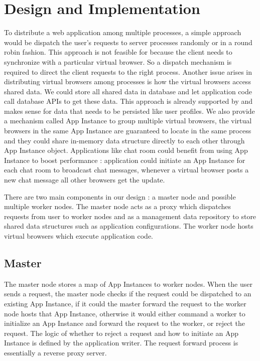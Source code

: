 \section{Design and Implementation}
\label{sec:implementation}

To distribute a web application among multiple processes, 
a simple approach would be dispatch the user's requests to server processes randomly or in a round robin fashion.
This approach is not feasible for \cb{} because 
the client needs to synchronize with a particular virtual browser.
So a dispatch mechanism is required to direct the client requests to the right process.
Another issue arises in distributing virtual browsers among processes is 
how the virtual browsers access shared data.
We could store all shared data in database and let application code call database APIs to get these data.
This approach is already supported by \cb{} and makes sense for data that needs to be persisted like user profiles. 
We also provide a mechanism called App Instance to group multiple virtual browsers,
the virtual browsers in the same App Instance are guaranteed to locate in the same process and they could
share in-memory data structure directly to each other through App Instance object.
Applications like chat room could benefit from using App Instance to boost performance :
application could initiate an App Instance for each chat room to broadcast chat messages, 
whenever a virtual browser posts a new chat message all other browsers get the update.





There are two main components in our design : a master node and possible multiple worker nodes.
The master node acts as a proxy which dispatches requests from user to worker nodes 
and as a management data repository to store shared data structures such as application configurations.
The worker node hosts virtual browsers which execute application code.


\subsection{Master}
The master node stores a map of App Instances to worker nodes.
When the user sends a request, 
the master node checks if the request could be dispatched to an existing App Instance,
if it could the master forward the request to the worker node hosts that App Instance, 
otherwise it would either command a worker to initialize an App Instance and forward the
request to the worker, or reject the request.
The logic of whether to reject a request and how to initiate an App Instance is defined by the application writer.
The request forward process is essentially a reverse proxy server.

